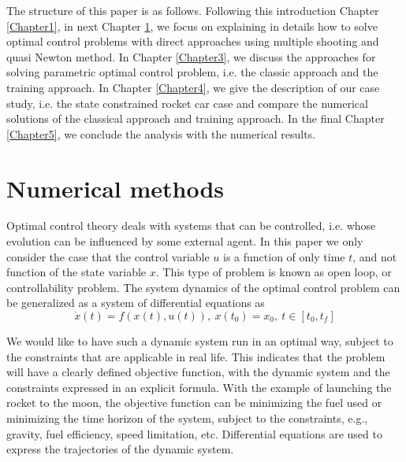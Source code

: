 \documentclass  [
  paper    = a4,
  BCOR     = 10mm,
  twoside,
  fontsize = 12pt,
  fleqn,
  toc      = bibnumbered,
  toc      = listofnumbered,
  numbers  = noendperiod,
  headings = normal,
  listof   = leveldown,
  version  = 3.03
]                                       {scrreprt}
\newcommand{\<}{\langle}
\renewcommand{\>}{\rangle}
\begin{document}

The structure of this paper is as follows. Following this introduction Chapter \ref{Chapter1}, in next Chapter \ref{Chapter2}, we focus on explaining in details how to solve optimal control problems with direct approaches using multiple shooting and quasi Newton method. In Chapter \ref{Chapter3}, we discuss the approaches for solving parametric optimal control problem, i.e. the classic approach and the training approach. In Chapter \ref{Chapter4}, we give the description of our case study, i.e. the state constrained rocket car case and compare the numerical solutions of the classical approach and training approach. In the final Chapter \ref{Chapter5}, we conclude the analysis with the numerical results. 




\chapter{Numerical methods}
\label{Chapter2}
Optimal control theory deals with systems that can be controlled, i.e. whose evolution can be influenced by some external agent. In this paper we only consider the case that the control variable $u$ is a function of only time $t$, and not function of the state variable $x$. This type of problem is known as open loop, or controllability problem. The system dynamics of the optimal control problem can be generalized as a system of differential equations as
\begin{equation}
	  \dot{x} (t) = f(x(t), u(t)), \ x(t_0) = x_0, \ t \in [t_0, t_f]
\end{equation}	  

We would like to have such a dynamic system run in an optimal way, subject to the constraints that are applicable in real life. This indicates that the problem will have a clearly defined objective function, with the dynamic system and the constraints expressed in an explicit formula. With the example of launching the rocket to the moon, the objective function can be minimizing the fuel used or minimizing the time horizon of the system, subject to the constraints, e.g., gravity, fuel efficiency, speed limitation, etc. Differential equations are used to express the trajectories of the dynamic system. 
\end{document}
